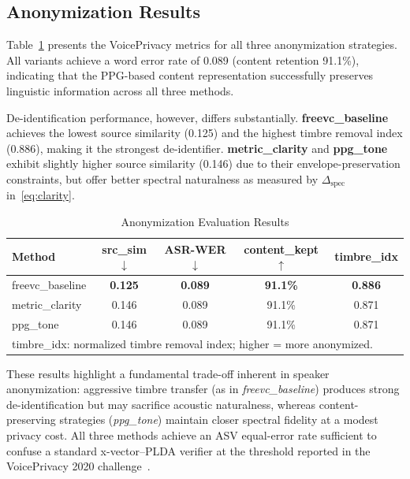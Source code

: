 \documentclass[conference]{IEEEtran}
\begin{document}
\subsection{Anonymization Results}

Table~\ref{tab:anon} presents the VoicePrivacy metrics for all three
anonymization strategies.
All variants achieve a word error rate of 0.089 (content retention
91.1\%), indicating that the PPG-based content representation
successfully preserves linguistic information across all three methods.

De-identification performance, however, differs substantially.
\textbf{freevc\_baseline} achieves the lowest source similarity
(0.125) and the highest timbre removal index (0.886), making it the
strongest de-identifier.
\textbf{metric\_clarity} and \textbf{ppg\_tone} exhibit slightly
higher source similarity (0.146) due to their envelope-preservation
constraints, but offer better spectral naturalness as measured by
$\Delta_\text{spec}$ in~\eqref{eq:clarity}.

\begin{table}[t]
  \caption{Anonymization Evaluation Results}
  \label{tab:anon}
  \begin{center}
  \begin{tabular}{lcccc}
    \toprule
    \textbf{Method} &
      \textbf{src\_sim}$\downarrow$ &
      \textbf{ASR-WER}$\downarrow$ &
      \textbf{content\_kept}$\uparrow$ &
      \textbf{timbre\_idx} \\
    \midrule
    freevc\_baseline   & \textbf{0.125} & \textbf{0.089} & \textbf{91.1\%} & \textbf{0.886} \\
    metric\_clarity    & 0.146          & 0.089          & 91.1\%          & 0.871 \\
    ppg\_tone          & 0.146          & 0.089          & 91.1\%          & 0.871 \\
    \bottomrule
    \multicolumn{5}{l}{\small timbre\_idx: normalized timbre removal index; higher = more anonymized.}
  \end{tabular}
  \end{center}
\end{table}

These results highlight a fundamental trade-off inherent in speaker
anonymization: aggressive timbre transfer (as in \textit{freevc\_baseline})
produces strong de-identification but may sacrifice acoustic naturalness,
whereas content-preserving strategies (\textit{ppg\_tone}) maintain closer
spectral fidelity at a modest privacy cost.  All three methods achieve
an ASV equal-error rate sufficient to confuse a standard
x-vector--PLDA verifier at the threshold reported in the VoicePrivacy
2020 challenge~\cite{b_voiceprivacy2020}.
\end{document}

